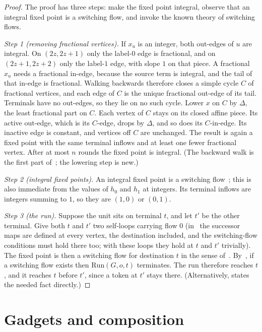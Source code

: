 \begin{proof}
The proof has three steps: make the fixed point integral, observe that an integral fixed point is a
switching flow, and invoke the known theory of switching flows.

\emph{Step 1 (removing fractional vertices).} If $x_u$ is an integer, both out-edges of $u$ are
integral. On $(2z,2z+1)$ only the label-$0$ edge is fractional, and on $(2z+1,2z+2)$ only the label-$1$
edge, with slope $1$ on that piece. A fractional $x_u$ needs a fractional in-edge, because the source
term is integral, and the tail of that in-edge is fractional. Walking backwards therefore closes a simple
cycle $C$ of fractional vertices, and each edge of $C$ is the unique fractional out-edge of its tail.
Terminals have no out-edges, so they lie on no such cycle. Lower $x$ on $C$ by $\Delta$, the least
fractional part on $C$. Each vertex of $C$ stays on its closed affine piece. Its active out-edge, which is
its $C$-edge, drops by $\Delta$, and so does its $C$-in-edge. Its inactive edge is constant, and vertices
off $C$ are unchanged. The result is again a fixed point with the same terminal inflows and at least one
fewer fractional vertex. After at most $n$ rounds the fixed point is integral. (The backward walk is the
first part of~\cite[Lemma 14]{haslebacher25}; the lowering step is new.)

\emph{Step 2 (integral fixed points).} An integral fixed point is a switching
flow~\cite[Lemma 14]{haslebacher25}; this is also immediate from the values of $h_0$ and $h_1$ at
integers. Its terminal inflows are integers summing to $1$, so they are $(1,0)$ or $(0,1)$.

\emph{Step 3 (the run).} Suppose the unit sits on terminal $t$, and let $t'$ be the other terminal. Give
both $t$ and $t'$ two self-loops carrying flow $0$ (in~\cite{dgkmw17} the successor maps are defined at every vertex, the destination included, and the switching-flow conditions must hold there too; with these loops they hold at $t$ and $t'$ trivially). The fixed point is then a switching flow for destination $t$ in
the sense of~\cite{dgkmw17}. By~\cite[Lemma 1]{dgkmw17}, if a switching flow exists then
$\mathrm{Run}(G,o,t)$ terminates. The run therefore reaches $t$, and it reaches $t$ before $t'$, since a
token at $t'$ stays there. (Alternatively, \cite[Theorem 1]{haslebacher25} states the needed fact
directly.)
\end{proof}

\section{Gadgets and composition}\label{sec:ar-compose}

